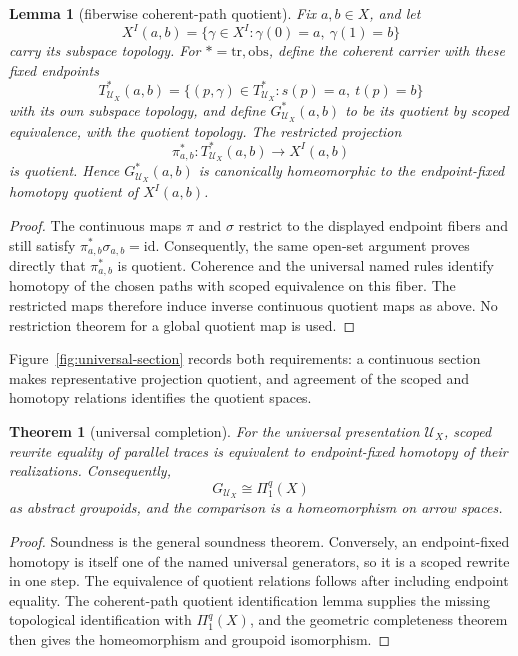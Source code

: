 \documentclass[10pt,reqno]{amsart}
\theoremstyle{definition}
\theoremstyle{plain}
\newtheorem{theorem}[definition]{Theorem}
\newtheorem{lemma}[definition]{Lemma}
\theoremstyle{remark}
\newcommand{\FigureAltText}[1]{\par\smallskip{\small\textbf{Alt text:} #1\par}}
\newcommand{\MainFigure}[2]{%
  \begingroup\let\SavedFigureCaption\caption
  \renewcommand{\caption}[1]{\SavedFigureCaption{##1}\FigureAltText{#2}}%
  \endgroup}
\begin{document}
\begin{lemma}[fiberwise coherent-path quotient]
\label{lem:fiberwise-coherent-path-quotient}
Fix $a,b\in X$, and let
\[
  X^I(a,b)=\{\gamma\in X^I:\gamma(0)=a,\ \gamma(1)=b\}
\]
carry its subspace topology.  For $*=\mathrm{tr},\mathrm{obs}$, define the
coherent carrier with these fixed endpoints
\[
  T_{\mathcal U_X}^{*}(a,b)=
  \{(p,\gamma)\in T_{\mathcal U_X}^{*}:s(p)=a,\ t(p)=b\}
\]
with its own subspace topology, and define
$G_{\mathcal U_X}^{*}(a,b)$ to be its quotient by scoped equivalence, with
the quotient topology.  The restricted projection
\[
  \pi_{a,b}^{*}:T_{\mathcal U_X}^{*}(a,b)\longrightarrow X^I(a,b)
\]
is quotient.  Hence $G_{\mathcal U_X}^{*}(a,b)$ is canonically homeomorphic
to the endpoint-fixed homotopy quotient of $X^I(a,b)$.
\end{lemma}

\begin{proof}
The continuous maps $\pi$ and $\sigma$ restrict to the displayed endpoint
fibers and still satisfy $\pi_{a,b}^{*}\sigma_{a,b}=\mathrm{id}$.
Consequently, the same open-set argument proves directly that
$\pi_{a,b}^{*}$ is quotient. Coherence and the universal named rules
identify homotopy of the chosen paths with scoped equivalence on this
fiber. The restricted maps therefore induce inverse continuous quotient
maps as above. No restriction theorem for a global quotient map is used.
\end{proof}

Figure~\ref{fig:universal-section} records both requirements: a continuous
section makes representative projection quotient, and agreement of the
scoped and homotopy relations identifies the quotient spaces.

\MainFigure{universal-section}{A continuous one-letter section splits representative projection; matching scoped and homotopy relations then identify their quotient spaces.}

\begin{theorem}[universal completion]\label{thm:universal-completion}
For the universal presentation $\mathcal U_X$, scoped rewrite equality of
parallel traces is equivalent to endpoint-fixed homotopy of their realizations.
Consequently,
\[
  G_{\mathcal U_X}\cong \Pi_1^q(X)
\]
as abstract groupoids, and the comparison is a homeomorphism on arrow spaces.
\end{theorem}

\begin{proof}
Soundness is the general soundness theorem.  Conversely, an endpoint-fixed
homotopy is itself one of the named universal generators, so it is a scoped
rewrite in one step.  The equivalence of quotient relations follows after
including endpoint equality.  The coherent-path quotient identification lemma
supplies the missing topological identification with $\Pi_1^q(X)$, and the
geometric completeness theorem then gives the homeomorphism and groupoid
isomorphism.
\end{proof}
\end{document}
